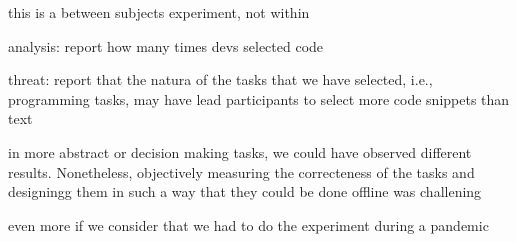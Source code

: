 this is a between subjects experiment, not within 



analysis: report how many times devs selected code

threat: report that the natura of the tasks that we have selected, i.e., programming tasks, may have lead participants to select more code snippets than text

in more abstract or decision making tasks, we could have observed different results. Nonetheless, objectively measuring the correcteness of the tasks and designingg them in such a way that they could be done offline was challening

even more if we consider that we had to do the experiment during a pandemic

\clearpage




























